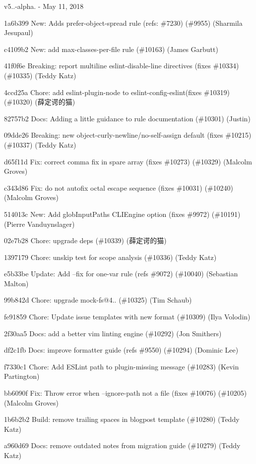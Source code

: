 v5..-\/alpha. -\/ May 11, 2018


\begin{DoxyItemize}
\item 1a6b399 New\+: Adds prefer-\/object-\/spread rule (refs\+: \#7230) (\#9955) (Sharmila Jesupaul)
\item c4109b2 New\+: add max-\/classes-\/per-\/file rule (\#10163) (James Garbutt)
\item 41f0f6e Breaking\+: report multiline eslint-\/disable-\/line directives (fixes \#10334) (\#10335) (Teddy Katz)
\item 4ccd25a Chore\+: add eslint-\/plugin-\/node to eslint-\/config-\/eslint(fixes \#10319) (\#10320) (薛定谔的猫)
\item 82757b2 Docs\+: Adding a little guidance to rule documentation (\#10301) (Justin)
\item 09dde26 Breaking\+: new object-\/curly-\/newline/no-\/self-\/assign default (fixes \#10215) (\#10337) (Teddy Katz)
\item d65f11d Fix\+: correct comma fix in spare array (fixes \#10273) (\#10329) (Malcolm Groves)
\item c343d86 Fix\+: do not autofix octal escape sequence (fixes \#10031) (\#10240) (Malcolm Groves)
\item 514013c New\+: Add {\ttfamily glob\+Input\+Paths} CLIEngine option (fixes \#9972) (\#10191) (Pierre Vanduynslager)
\item 02e7b28 Chore\+: upgrade deps (\#10339) (薛定谔的猫)
\item 1397179 Chore\+: unskip test for scope analysis (\#10336) (Teddy Katz)
\item e5b33be Update\+: Add --fix for one-\/var rule (refs \#9072) (\#10040) (Sebastian Malton)
\item 99b842d Chore\+: upgrade mock-\/fs@4.. (\#10325) (Tim Schaub)
\item fe91859 Chore\+: Update issue templates with new format (\#10309) (Ilya Volodin)
\item 2f30aa5 Docs\+: add a better vim linting engine (\#10292) (Jon Smithers)
\item df2c1fb Docs\+: improve formatter guide (refs \#9550) (\#10294) (Dominic Lee)
\item f7330c1 Chore\+: Add ESLint path to plugin-\/missing message (\#10283) (Kevin Partington)
\item bb6090f Fix\+: Throw error when --ignore-\/path not a file (fixes \#10076) (\#10205) (Malcolm Groves)
\item 1b6b2b2 Build\+: remove trailing spaces in blogpost template (\#10280) (Teddy Katz)
\item a960d69 Docs\+: remove outdated notes from migration guide (\#10279) (Teddy Katz)
\end{DoxyItemize}


